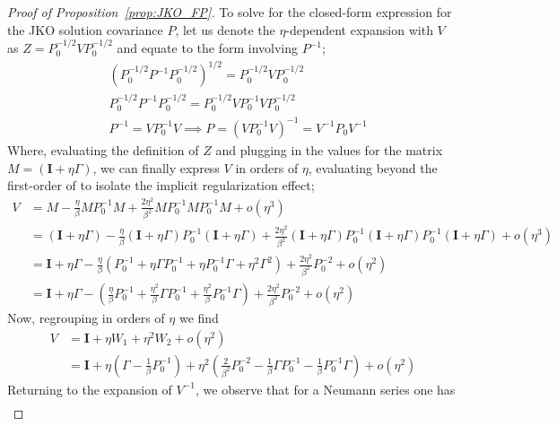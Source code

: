 \documentclass[reqno,11pt,letterpaper]{amsart}
\theoremstyle{plain}
\theoremstyle{definition}
\theoremstyle{remark}
\newcommand{\id}{\mathbf{I}}
\begin{document}
\begin{proof}[Proof of Proposition~\ref{prop:JKO_FP}]
To solve for the closed-form expression for the JKO solution covariance $P$, let us denote the $\eta$-dependent expansion with $V$ as $Z = P_{0}^{-1/2} V P_{0}^{-1/2}$ and equate to the form involving $P^{-1}$;
\begin{align*}
    &\left(
   P_{0}^{-1/2} P^{-1} P_{0}^{-1/2}
   \right)^{1/2} =  P_{0}^{-1/2} V P_{0}^{-1/2} \\
   & P_{0}^{-1/2} P^{-1} P_{0}^{-1/2}
    =  P_{0}^{-1/2} V P_{0}^{-1} V P_{0}^{-1/2} \\
    & P^{-1} 
    = V P_{0}^{-1} V    
    \implies P 
    =  \left( V P_{0}^{-1} V \right)^{-1} = V^{-1} P_{0} V^{-1}
\end{align*}
Where, evaluating the definition of $Z$ and plugging in the values for the matrix $M = (\id + \eta \Gamma )$, we can finally express $V$ in orders of $\eta$, evaluating beyond the first-order of \cite{Halder2017} to isolate the implicit regularization effect;
\begin{align*}
    V &=  M  - \frac{ \eta}{\beta}
    M P_{0}^{-1} M  + \frac{2 \eta^{2}}{\beta^{2}}  M P_{0}^{-1} M P_{0}^{-1} M   + o(\eta^{3}) \\
    &= (\id + \eta \Gamma ) - \frac{ \eta}{\beta}
    (\id + \eta \Gamma ) P_{0}^{-1} (\id + \eta \Gamma )  + \frac{2 \eta^{2}}{\beta^{2}}  (\id + \eta \Gamma ) P_{0}^{-1} (\id + \eta \Gamma ) P_{0}^{-1} (\id + \eta \Gamma )   + o(\eta^{3}) \\
    &= \id + \eta \Gamma - \frac{\eta}{\beta} \left( P_{0}^{-1} + \eta \Gamma P_{0}^{-1} + \eta P_{0}^{-1} \Gamma + \eta^{2} \Gamma^{2} 
    \right) + \frac{2 \eta^{2}}{\beta^{2}} P_{0}^{-2} + o(\eta^{2}) \\
    &= \id + \eta \Gamma - \left( \frac{\eta}{\beta} P_{0}^{-1} + \frac{\eta^{2}}{\beta} \Gamma P_{0}^{-1} + \frac{\eta^{2}}{\beta} P_{0}^{-1} \Gamma  
    \right) + \frac{2 \eta^{2}}{\beta^{2}} P_{0}^{-2} + o(\eta^{2})
\end{align*}
Now, regrouping in orders of $\eta$ we find
\begin{align*}
     V &= \id + \eta W_{1} + \eta^{2} W_{2}  + o(\eta^{2}) \\
     &= \id + \eta \left( \Gamma - \frac{1}{\beta} P_{0}^{-1}
     \right) + \eta^{2}
      \left(
      \frac{2 }{\beta^{2}} P_{0}^{-2} - \frac{1}{\beta} \Gamma P_{0}^{-1} - \frac{1}{\beta} P_{0}^{-1} \Gamma  
    \right)  + o(\eta^{2})
\end{align*}
Returning to the expansion of $V^{-1}$, we observe that for a Neumann series one has
\begin{align*}

\end{align*}
\end{proof}
\end{document}
